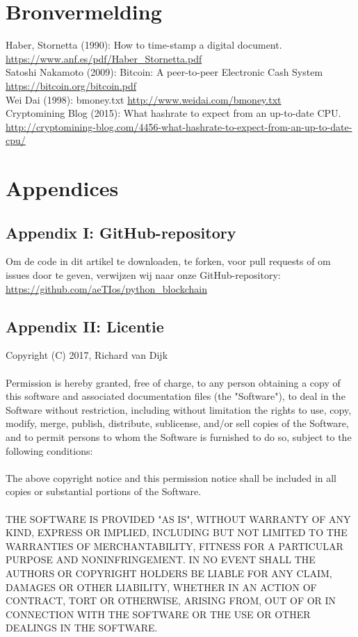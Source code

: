 \documentclass{article}
\begin{document}
\section{Bronvermelding}

Haber, Stornetta (1990): How to time-stamp a digital document. \url{https://www.anf.es/pdf/Haber_Stornetta.pdf}
\\ Satoshi Nakamoto (2009): Bitcoin: A peer-to-peer Electronic Cash System \url{https://bitcoin.org/bitcoin.pdf} 
\\ Wei Dai (1998): bmoney.txt \url{http://www.weidai.com/bmoney.txt}
\\ Cryptomining Blog (2015): What hashrate to expect from an up-to-date CPU. \url{http://cryptomining-blog.com/4456-what-hashrate-to-expect-from-an-up-to-date-cpu/}


\newpage
\section{Appendices}
\subsection{Appendix I: GitHub-repository}
Om de code in dit artikel te downloaden, te forken, voor pull requests of om issues door te geven, verwijzen wij naar onze GitHub-repository:\\ 
\url{https://github.com/aeTIos/python_blockchain}
\subsection{Appendix II: Licentie}
Copyright (C) 2017, Richard van Dijk \\ \\
Permission is hereby granted, free of charge, to any person obtaining a copy of this software and associated documentation files (the "Software"), to deal in the Software without restriction, including without limitation the rights to use, copy, modify, merge, publish, distribute, sublicense, and/or sell copies of the Software, and to permit persons to whom the Software is furnished to do so, subject to the following conditions:\\ \\
The above copyright notice and this permission notice shall be included in all copies or substantial portions of the Software. \\ \\
THE SOFTWARE IS PROVIDED "AS IS", WITHOUT WARRANTY OF ANY KIND, EXPRESS OR IMPLIED, INCLUDING BUT NOT LIMITED TO THE WARRANTIES OF MERCHANTABILITY, FITNESS FOR A PARTICULAR PURPOSE AND NONINFRINGEMENT. IN NO EVENT SHALL THE AUTHORS OR COPYRIGHT HOLDERS BE LIABLE FOR ANY CLAIM, DAMAGES OR OTHER LIABILITY, WHETHER IN AN ACTION OF CONTRACT, TORT OR OTHERWISE, ARISING FROM, OUT OF OR IN CONNECTION WITH THE SOFTWARE OR THE USE OR OTHER DEALINGS IN THE SOFTWARE.
\end{document}

